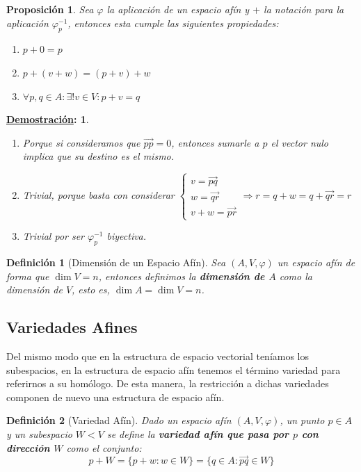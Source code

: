 \documentclass[10pt,a4paper,openright]{book}
\theoremstyle{break}
\newtheorem*{defi}{Definición}
\newtheorem*{prop}{Proposición}
\newtheorem*{demo}{\underline{Demostración}:}
\begin{document}
\begin{prop}
Sea $\varphi$ la aplicación de un espacio afín y $+$ la notación para la aplicación $\varphi_p^{-1}$, entonces esta cumple las siguientes propiedades:
\begin{enumerate}
\item $p + 0 = p$
\item $p + (v+ w) = (p + v)+ w$
\item $\forall p,q \in A: \exists! v \in V : p + v = q$
\end{enumerate}
\end{prop}
\begin{demo}
\begin{enumerate}
\item Porque si consideramos que $\vec{pp}= 0$, entonces sumarle a $p$ el vector nulo implica que su destino es el mismo.

\item Trivial, porque basta con considerar $\begin{cases} v = \vec{pq} \\ w = \vec{qr} \\ v + w = \vec{pr} \end{cases} \Rightarrow r = q + w = q + \vec{qr} = r$

\item Trivial por ser $\varphi_p^{-1}$ biyectiva.
\end{enumerate}
\end{demo}

\begin{defi}[Dimensión de un Espacio Afín]
Sea $(A,V,\varphi)$ un espacio afín de forma que $\dim V = n$, entonces definimos la \textbf{dimensión de $A$} como la dimensión de $V$, esto es, $\dim A = \dim V = n$.
\end{defi}

\subsection{Variedades Afines}
Del mismo modo que en la estructura de espacio vectorial teníamos los subespacios, en la estructura de espacio afín tenemos el término variedad para referirnos a su homólogo. De esta manera, la restricción a dichas variedades componen de nuevo una estructura de espacio afín.

\begin{defi}[Variedad Afín]
Dado un espacio afín $(A,V,\varphi)$, un punto $p \in A$ y un subespacio $W < V$ se define la \textbf{variedad afín que pasa por $p$ con dirección $W$} como el conjunto:
$$p + W = \{p + w : w \in W\} = \{q\in A : \vec{pq}\in W\}$$
\end{defi}
\end{document}
